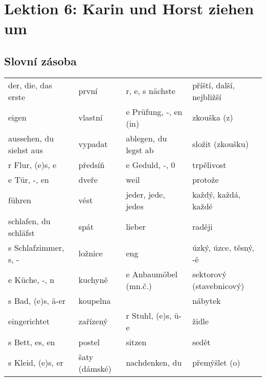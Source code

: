\setchaptertoc
\chapter{Lektion 6: Karin und Horst ziehen um}\label{NJ:chap_N1_L6}

  
  \section{Slovní zásoba}
    \begin{table}[ht!]   %
      \centering
      \begin{tabular}{llll}
        \hline
          der, die, das erste     & první    & r, e, s nächste        & příští, další, nejbližší  \\
          eigen                   & vlastní  & e Prüfung, -, en (in)  &  zkouška (z)              \\
          aussehen, du siehst aus & vypadat  &  ablegen, du legst ab  & složit (zkoušku)          \\
          r Flur, (e)s, e         & předsíň  & e Geduld, -, 0         & trpělivost                \\
          e Tür, -, en            & dveře    & weil                   & protože                   \\
          führen                  & vést     & jeder, jede, jedes     & každý, každá, každé       \\
          schlafen, du schläfst   & spát     &  lieber                & raději                    \\
          s Schlafzimmer, s, -    & ložnice  & eng                    & úzký, úzce, těsný, -ě     \\
          e Küche, -, n           & kuchyně  & e Anbaumöbel (mn.č.)   & sektorový (stavebnicový)  \\
          s Bad, (e)s, ä-er       & koupelna &                        &  nábytek                  \\
          eingerichtet            & zařízený &  r Stuhl, (e)s, ü-e    & židle                     \\
          s Bett, es, en          & postel   & sitzen                 &  sedět                    \\
          s Kleid, (e)s, er       & šaty (dámské) & nachdenken, du    & přemýšlet (o)             \\

\end{tabular}
\end{table}
